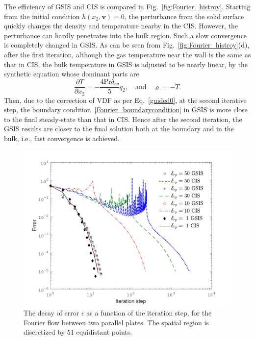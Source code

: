The efficiency of GSIS and CIS is compared in Fig.~\ref{fig:Fourier_histroy}. Starting from the initial condition $h(x_2,\bm{v})=0$, the perturbance from the solid surface quickly changes the density and temperature nearby in the CIS. However, the perturbance  can hardly penetrates into the bulk region. Such a slow convergence is completely changed in GSIS. As can be seen from Fig.~\ref{fig:Fourier_histroy}(d), after the first iteration, although the gas temperature near the wall is the same as that in CIS, the bulk temperature in GSIS is adjusted to be nearly linear, by the synthetic equation whose dominant parts are 
\begin{equation}
\frac{\partial T}{\partial x_2}=-\frac{4\text{Pr}\delta_{rp}}{5}q_{2}, \quad
\text{and} \quad
\varrho=-T.
\end{equation}
Then, due to the correction of VDF as per Eq.~\eqref{guided0}, at the second iterative step, the boundary condition~\eqref{Fourier_boundarycondition} in GSIS  is more close to the final steady-state than that in CIS. Hence after the second iteration, the GSIS results are closer to the final solution both at the boundary and in the bulk, i.e., fast convergence is achieved.	




\begin{figure}[t]
	\centering
	\includegraphics[width=0.7\columnwidth]{GSIS/IMG/Fourier_convergence_error.pdf}
	\caption{The decay of error $\epsilon$ as a function of the iteration step, for the Fourier flow between two parallel plates. The spatial region is discretized by 51 equidistant points.  }
	\label{fig:Fourier_speed}
\end{figure}

